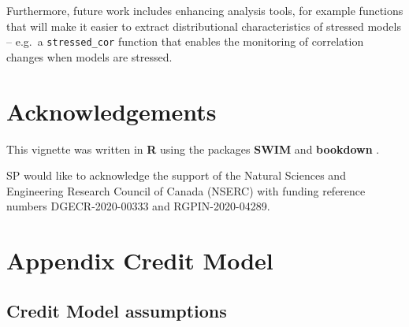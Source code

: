 \documentclass[
]{article}
\begin{document}
Furthermore, future work includes enhancing analysis tools, for example functions that will make it easier to extract distributional characteristics of stressed models -- e.g.~a \texttt{stressed\_cor} function that enables the monitoring of correlation changes when models are stressed.

\hypertarget{acknowledgements}{%
\section*{Acknowledgements}\label{acknowledgements}}

This vignette was written in \textbf{R} \citep{R-base} using the packages \textbf{SWIM} \citep{PesentiR} and \textbf{bookdown} \citep{R-bookdown}.

SP would like to acknowledge the support of the Natural Sciences and Engineering Research Council of Canada
(NSERC) with funding reference numbers DGECR-2020-00333 and RGPIN-2020-04289.

\hypertarget{appendix-appendix}{%
\appendix}


\hypertarget{AppendixCM}{%
\section{Appendix Credit Model}\label{AppendixCM}}

\hypertarget{credit-model-assumptions}{%
\subsection{Credit Model assumptions}\label{credit-model-assumptions}}
\end{document}
